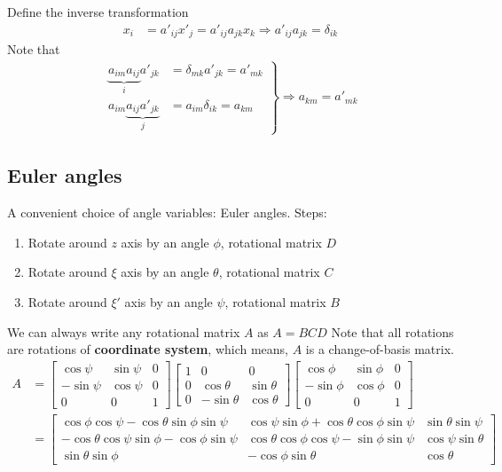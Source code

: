 \documentclass[twoside,9pt]{article}
\numberwithin{equation}{section} %
\theoremstyle{definition}
\theoremstyle{remark}
\begin{document}
Define the inverse transformation
\begin{align}
    x_i &= a'_{ij}x'_j = a'_{ij}a_{jk}x_k\Rightarrow
    a'_{ij}a_{jk} = \delta_{ik}
\end{align}
Note that
\begin{align}
    \left.
    \begin{aligned}
        \underbrace{a_{im}a_{ij}}_i a'_{jk} &= \delta_{mk}a'_{jk} = a'_{mk}\\
        a_{im}\underbrace{a_{ij}a'_{jk}}_j &= a_{im}\delta_{ik} = a_{km}
    \end{aligned}
    \right\}
    \Rightarrow a_{km} = a'_{mk}
\end{align}

\subsection{Euler angles}
A convenient choice of angle variables: Euler angles.
Steps:
\begin{enumerate}
    \item Rotate around $z$ axis by an angle $\phi$, rotational matrix $D$
    \item Rotate around $\xi$ axis by an angle $\theta$, rotational matrix $C$
    \item Rotate around $\xi'$ axis by an angle $\psi$, rotational matrix $B$
\end{enumerate}
We can always write any rotational matrix $A$ as $A = BCD$
Note that all rotations are rotations of \textbf{coordinate system}, which means,
$A$ is a change-of-basis matrix.
\begin{align}
    A &= 
    \begin{bmatrix}
        \cos\psi &  \sin\psi & 0\\
        -\sin\psi & \cos\psi & 0\\
        0 & 0 & 1
    \end{bmatrix}
    \begin{bmatrix}
        1 & 0 & 0\\
        0 & \cos\theta & \sin\theta \\
        0 & -\sin\theta & \cos\theta
    \end{bmatrix}
    \begin{bmatrix}
        \cos\phi & \sin\phi & 0\\
        -\sin\phi & \cos\phi & 0\\
        0 & 0 & 1
    \end{bmatrix}\\
      &= 
    \begin{bmatrix}
        \cos\phi\cos\psi - \cos\theta\sin\phi\sin\psi & 
        \cos\psi\sin\phi + \cos\theta\cos\phi\sin\psi &
        \sin\theta\sin\psi\\
        -\cos\theta\cos\psi\sin\phi - \cos\phi\sin\psi &
        \cos\theta\cos\phi\cos\psi - \sin\phi\sin\psi &
        \cos\psi\sin\theta\\
        \sin\theta\sin\phi &
        -\cos\phi\sin\theta &
        \cos\theta
    \end{bmatrix}
\end{align}
\end{document}
